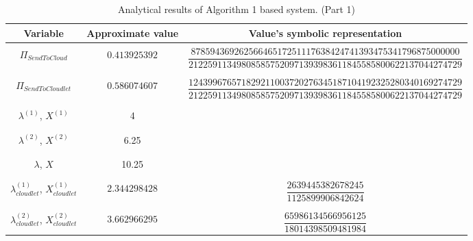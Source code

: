 \documentclass[10pt,a4paper]{article}
\begin{document}
\begin{table}[h!]
\caption{Analytical results of Algorithm 1 based system. (Part 1)}
\begin{adjustbox}{center=\textwidth}
	
     \begin{tabular}{c|c|c}
     \toprule
     \textbf{Variable} & \textbf{Approximate value} & \textbf{Value's symbolic representation} \\
     \toprule
	 &&\\
	 $\Pi_{SendToCloud}$ & $0.413925392$ & $\dfrac{87859436926256646517251117638424741393475341796875000000}{212259113498085857520971393983611845585800622137044274729}$  \\
	 
	 &&\\\hline &&\\
	 
	 $\Pi_{SendToCloudlet}$ & $0.586074607$ &  $\dfrac{124399676571829211003720276345187104192325280340169274729}{212259113498085857520971393983611845585800622137044274729}$  \\
	 
     &&\\\hline &&\\

	 $\lambda^{(1)}$, $X^{(1)}$ & 4 & \\
	 
	 &&\\\hline &&\\

	 $\lambda^{(2)}$, $X^{(2)}$ & 6.25 & \\
	 
	 &&\\\hline &&\\

	 $\lambda$, $X$ & 10.25 & \\
	 
	 &&\\\hline &&\\

     $\lambda_{cloudlet}^{(1)}$, $X_{cloudlet}^{(1)}$ & $2.344298428$ & $\dfrac{2639445382678245}{1125899906842624}$ \\

	 &&\\\hline &&\\

     $\lambda_{cloudlet}^{(2)}$, $X_{cloudlet}^{(2)}$ & $3.662966295$ & $\dfrac{65986134566956125}{18014398509481984}$ \\


\end{tabular}
\end{adjustbox}
\end{table}
\end{document}
